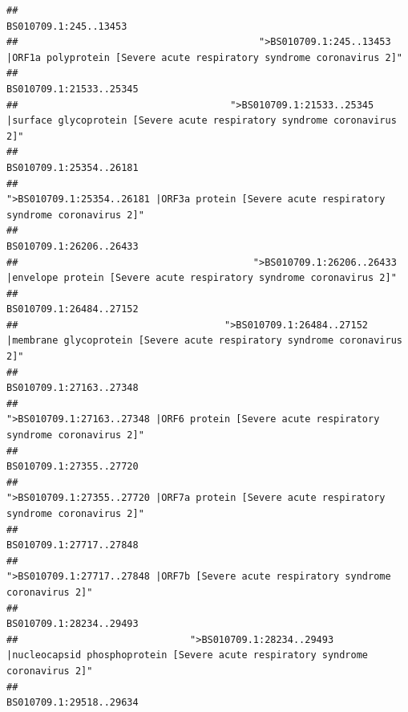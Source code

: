 \documentclass[
]{article}
\begin{document}
\begin{verbatim}
##                                                                                                                  BS010709.1:245..13453 
##                                          ">BS010709.1:245..13453 |ORF1a polyprotein [Severe acute respiratory syndrome coronavirus 2]" 
##                                                                                                                BS010709.1:21533..25345 
##                                     ">BS010709.1:21533..25345 |surface glycoprotein [Severe acute respiratory syndrome coronavirus 2]" 
##                                                                                                                BS010709.1:25354..26181 
##                                            ">BS010709.1:25354..26181 |ORF3a protein [Severe acute respiratory syndrome coronavirus 2]" 
##                                                                                                                BS010709.1:26206..26433 
##                                         ">BS010709.1:26206..26433 |envelope protein [Severe acute respiratory syndrome coronavirus 2]" 
##                                                                                                                BS010709.1:26484..27152 
##                                    ">BS010709.1:26484..27152 |membrane glycoprotein [Severe acute respiratory syndrome coronavirus 2]" 
##                                                                                                                BS010709.1:27163..27348 
##                                             ">BS010709.1:27163..27348 |ORF6 protein [Severe acute respiratory syndrome coronavirus 2]" 
##                                                                                                                BS010709.1:27355..27720 
##                                            ">BS010709.1:27355..27720 |ORF7a protein [Severe acute respiratory syndrome coronavirus 2]" 
##                                                                                                                BS010709.1:27717..27848 
##                                                    ">BS010709.1:27717..27848 |ORF7b [Severe acute respiratory syndrome coronavirus 2]" 
##                                                                                                                BS010709.1:28234..29493 
##                              ">BS010709.1:28234..29493 |nucleocapsid phosphoprotein [Severe acute respiratory syndrome coronavirus 2]" 
##                                                                                                                BS010709.1:29518..29634 

\end{verbatim}
\end{document}
